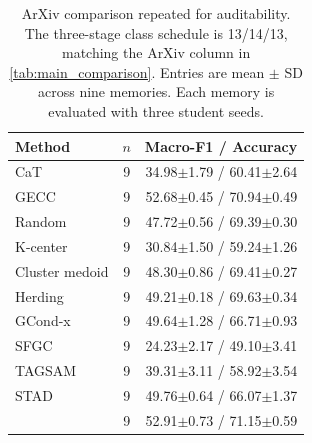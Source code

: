 \begin{table}[H]
\centering
\footnotesize
\caption{ArXiv comparison repeated for auditability. The three-stage class schedule is 13/14/13, matching the ArXiv column in \autoref{tab:main_comparison}. Entries are mean $\pm$ SD across nine memories. Each memory is evaluated with three student seeds.}
\label{tab:arxiv_three_stage}
\begin{tabular*}{\linewidth}{@{\extracolsep{\fill}}lcr@{}}
\toprule
Method & $n$ & Macro-F1 / Accuracy\\
\midrule
CaT & 9 & 34.98$\pm$1.79 / 60.41$\pm$2.64\\
GECC & 9 & 52.68$\pm$0.45 / 70.94$\pm$0.49\\
Random & 9 & 47.72$\pm$0.56 / 69.39$\pm$0.30\\
K-center & 9 & 30.84$\pm$1.50 / 59.24$\pm$1.26\\
Cluster medoid & 9 & 48.30$\pm$0.86 / 69.41$\pm$0.27\\
Herding & 9 & 49.21$\pm$0.18 / 69.63$\pm$0.34\\
GCond-x & 9 & 49.64$\pm$1.28 / 66.71$\pm$0.93\\
SFGC & 9 & 24.23$\pm$2.17 / 49.10$\pm$3.41\\
TAGSAM & 9 & 39.31$\pm$3.11 / 58.92$\pm$3.54\\
STAD & 9 & 49.76$\pm$0.64 / 66.07$\pm$1.37\\
\method{} & 9 & 52.91$\pm$0.73 / 71.15$\pm$0.59\\
\bottomrule
\end{tabular*}
\end{table}
